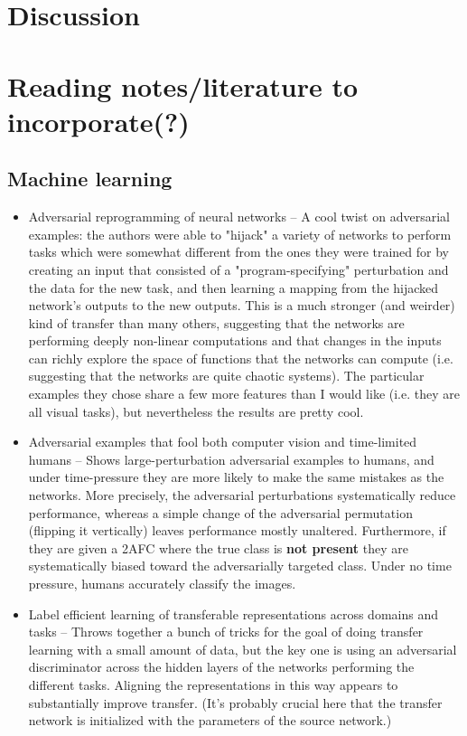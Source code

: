 \documentclass[11pt]{article}
\begin{document}
\section{Discussion}

    

\section{Reading notes/literature to incorporate(?)}
\subsection{Machine learning}
\begin{itemize}
\item Adversarial reprogramming of neural networks -- A cool twist on adversarial examples: the authors were able to "hijack" a variety of networks to perform tasks which were somewhat different from the ones they were trained for by creating an input that consisted of a "program-specifying" perturbation and the data for the new task, and then learning a mapping from the hijacked network's outputs to the new outputs. This is a much stronger (and weirder) kind of transfer than many others, suggesting that the networks are performing deeply non-linear computations and that changes in the inputs can richly explore the space of functions that the networks can compute (i.e. suggesting that the networks are quite chaotic systems). The particular examples they chose share a few more features than I would like (i.e. they are all visual tasks), but nevertheless the results are pretty cool. \citep{Elsayed2018}
\item Adversarial examples that fool both computer vision and time-limited humans -- Shows large-perturbation adversarial examples to humans, and under time-pressure they are more likely to make the same mistakes as the networks. More precisely, the adversarial perturbations systematically reduce performance, whereas a simple change of the adversarial permutation (flipping it vertically) leaves performance mostly unaltered. Furthermore, if they are given a 2AFC where the true class is \textbf{not present} they are systematically biased toward the adversarially targeted class. Under no time pressure, humans accurately classify the images.
\item Label efficient learning of transferable representations across domains and tasks -- Throws together a bunch of tricks for the goal of doing transfer learning with a small amount of data, but the key one is using an adversarial discriminator across the hidden layers of the networks performing the different tasks. Aligning the representations in this way appears to substantially improve transfer. (It's probably crucial here that the transfer network is initialized with the parameters of the source network.) \citep{Luo2017} 

\end{itemize}
\end{document}
